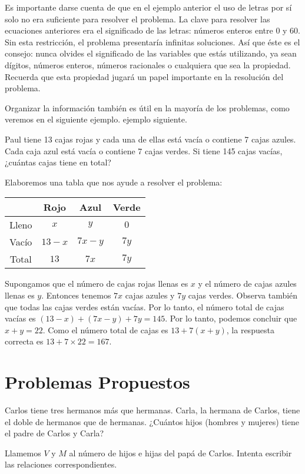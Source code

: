 \documentclass[11pt]{scrartcl}
\begin{document}
Es importante darse cuenta de que en el ejemplo anterior el uso de letras por sí solo no era suficiente para resolver el problema. La clave para resolver las ecuaciones anteriores era el significado de las letras: números enteros entre 0 y 60. Sin esta restricción, el problema presentaría infinitas soluciones. Así que éste es el consejo: nunca olvides el significado de las variables que estás utilizando, ya sean dígitos, números enteros, números racionales o cualquiera que sea la propiedad. Recuerda que esta propiedad jugará un papel importante en la resolución del problema.

Organizar la información también es útil en la mayoría de los problemas, como veremos en el siguiente ejemplo.
ejemplo siguiente.

\begin{example}
    Paul tiene 13 cajas rojas y cada una de ellas está vacía o contiene 7 cajas azules. Cada caja azul está vacía o contiene 7 cajas verdes. Si tiene 145 cajas vacías, ¿cuántas cajas tiene en total?
\end{example}
Elaboremos una tabla que nos ayude a resolver el problema:

\begin{center}
\begin{tabular}{|c|c|c|c|}
\hline
 & Rojo & Azul & Verde \\
\hline
Lleno & $x$ & $y$ & $0$ \\
\hline
Vacío & $13 - x$ & $7x - y$ & $7y$ \\
\hline
Total & $13$ & $7x$ & $7y$ \\
\hline
\end{tabular}
\end{center}

Supongamos que el número de cajas rojas llenas es $x$ y el número de cajas azules llenas es $y$. Entonces tenemos $7x$ cajas azules y $7y$ cajas verdes. Observa también que todas las cajas verdes están vacías. Por lo tanto, el número total de cajas vacías es $(13-x) + (7x-y) + 7y = 145$. Por lo tanto, podemos concluir que $x+y = 22$. Como el número total de cajas es $13 + 7(x+y)$, la respuesta correcta es $13 + 7 \times 22 = 167$.


\section{Problemas Propuestos}
\begin{problem}
    Carlos tiene tres hermanos más que hermanas. Carla, la hermana de Carlos, tiene el doble de hermanos que de hermanas. ¿Cuántos hijos (hombres y mujeres) tiene el padre de Carlos y Carla?
    \begin{hint}
        Llamemos $V$ y $M$ al número de hijos e hijas del papá de Carlos. Intenta escribir las relaciones correspondientes.
    \end{hint}
\end{problem}
\end{document}
